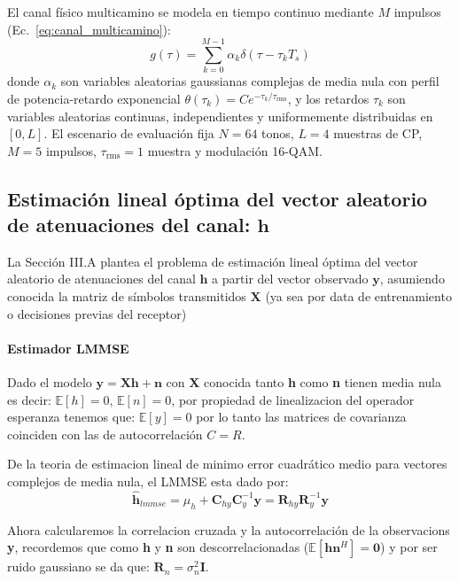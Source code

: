 \documentclass[a4paper]{article}
\begin{document}
El canal físico multicamino se modela en tiempo continuo mediante $M$ impulsos (Ec.~\eqref{eq:canal_multicamino}):
\begin{equation}
    g(\tau) = \sum_{k=0}^{M-1} \alpha_k \delta(\tau - \tau_k T_s)
    \label{eq:canal_multicamino}
\end{equation}
donde $\alpha_k$ son variables aleatorias gaussianas complejas de media nula con perfil de potencia-retardo exponencial $\theta(\tau_k) = C e^{-\tau_k / \tau_{\mathrm{rms}}}$, y los retardos $\tau_k$ son variables aleatorias continuas, independientes y uniformemente distribuidas en $[0, L]$. El escenario de evaluación fija $N=64$ tonos, $L=4$ muestras de CP, $M=5$ impulsos, $\tau_{\mathrm{rms}}=1$ muestra y modulación 16-QAM. 


\subsection*{Estimación lineal óptima del vector aleatorio de atenuaciones del canal: $\mathbf{h}$}

La Sección III.A plantea el problema de estimación lineal óptima del vector aleatorio de atenuaciones del canal $\mathbf{h}$ a partir del vector observado $\mathbf{y}$, asumiendo conocida la matriz de símbolos transmitidos $\mathbf{X}$ (ya sea por data de entrenamiento o decisiones previas del receptor)

\paragraph{Estimador LMMSE}
Dado el modelo $\mathbf{y} = \mathbf{X}\mathbf{h} + \mathbf{n}$ con $\mathbf{X}$ conocida tanto \textbf{h} como \textbf{n} tienen media nula es decir: $ \mathbb{E} [h] = 0 $, $ \mathbb{E}[n] = 0$, por propiedad de linealizacion del operador esperanza tenemos que: $\mathbb{E}[y]=0$ por lo tanto las matrices de covarianza coinciden con las de autocorrelación $C=R$.

De la teoria de estimacion lineal de minimo error cuadrático medio para vectores complejos de media nula, el LMMSE esta dado por: $$\hat{\mathbf{h}}_{lmmse} = \mu_h + \mathbf{C}_{hy} \mathbf{C}_{y}^{-1} \mathbf{y} = \mathbf{R}_{hy} \mathbf{R}_{y}^{-1} \mathbf{y}$$

Ahora calcularemos la correlacion cruzada y la autocorrelación de la observacions \textbf{y}, recordemos que como \textbf{h} y \textbf{n} son descorrelacionadas ($\mathbb{E}[\mathbf{h}\mathbf{n}^H] = \mathbf{0}$) y por ser ruido gaussiano se da que: $\mathbf{R}_{n} = \sigma_n^2 \mathbf{I}$.
\end{document}
